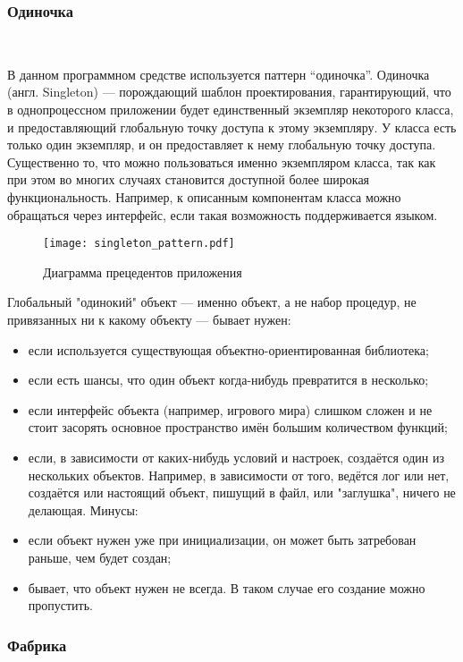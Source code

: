 \subsubsection{Одиночка}
\

В данном программном средстве используется паттерн “одиночка”.
Одиночка (англ. Singleton) — порождающий шаблон проектирования, гарантирующий, что в однопроцессном приложении будет единственный экземпляр некоторого класса, и предоставляющий глобальную точку доступа к этому экземпляру. У класса есть только один экземпляр, и он предоставляет к нему глобальную точку доступа. Существенно то, что можно пользоваться именно экземпляром класса, так как при этом во многих случаях становится доступной более широкая функциональность. Например, к описанным компонентам класса можно обращаться через интерфейс, если такая возможность поддерживается языком.

\begin{figure}
\centering
    \texttt{[image: singleton\_pattern.pdf]}
    \caption{Диаграмма прецедентов приложения}
\end{figure}

Глобальный "одинокий" объект — именно объект, а не набор процедур, не привязанных ни к какому объекту — бывает нужен:

\begin{itemize}
    \item если используется существующая объектно-ориентированная библиотека;
    \item если есть шансы, что один объект когда-нибудь превратится в несколько;
    \item если интерфейс объекта (например, игрового мира) слишком сложен и не стоит засорять основное пространство имён большим количеством функций;
    \item если, в зависимости от каких-нибудь условий и настроек, создаётся один из нескольких объектов. Например, в зависимости от того, ведётся лог или нет, создаётся или настоящий объект, пишущий в файл, или "заглушка", ничего не делающая.
    Минусы:
    \item если объект нужен уже при инициализации, он может быть затребован раньше, чем будет создан;
    \item бывает, что объект нужен не всегда. В таком случае его создание можно пропустить.
\end{itemize}

\subsubsection{Фабрика}
\

